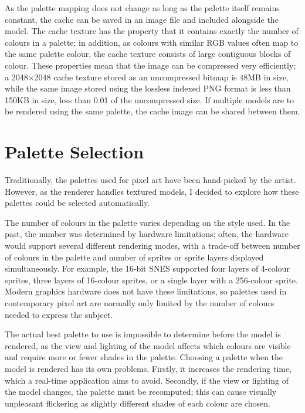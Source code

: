 \documentclass[12pt,twoside,notitlepage]{report}
\begin{document}
As the palette mapping does not change as long as the palette itself remains constant, the cache can be saved in an image file and included alongside the model. The cache texture has the property that it contains exactly the number of colours in a palette; in addition, as colours with similar RGB values often map to the same palette colour, the cache texture consists of large contiguous blocks of colour. These properties mean that the image can be compressed very efficiently; a 2048$\times$2048 cache texture stored as an uncompressed bitmap is 48MB in size, while the same image stored using the lossless indexed PNG format is less than 150KB in size, less than 0.01 of the uncompressed size. If multiple models are to be rendered using the same palette, the cache image can be shared between them.

\section{Palette Selection}
\label{subsec:paletteselection}

Traditionally, the palettes used for pixel art have been hand-picked by the artist. However, as the renderer handles textured models, I decided to explore how these palettes could be selected automatically.

The number of colours in the palette varies depending on the style used. In the past, the number was determined by hardware limitations; often, the hardware would support several different rendering modes, with a trade-off between number of colours in the palette and number of sprites or sprite layers displayed simultaneously. For example, the 16-bit SNES supported four layers of 4-colour sprites, three layers of 16-colour sprites, or a single layer with a 256-colour sprite. Modern graphics hardware does not have these limitations, so palettes used in contemporary pixel art are normally only limited by the number of colours needed to express the subject.

The actual best palette to use is impossible to determine before the model is rendered, as the view and lighting of the model affects which colours are visible and require more or fewer shades in the palette. Choosing a palette when the model is rendered has its own problems. Firstly, it increases the rendering time, which a real-time application aims to avoid. Secondly, if the view or lighting of the model changes, the palette must be recomputed; this can cause visually unpleasant flickering as slightly different shades of each colour are chosen.
\end{document}
